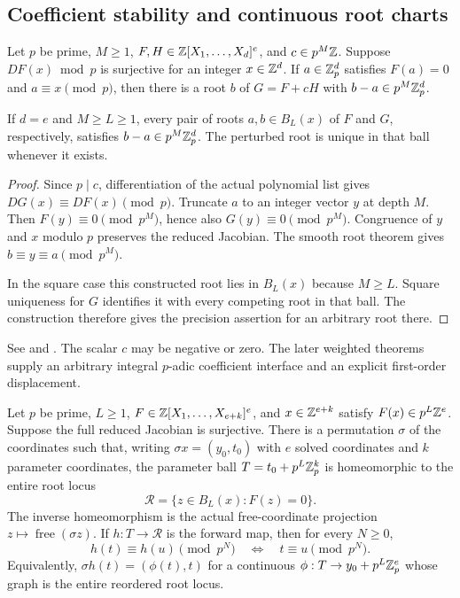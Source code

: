 \subsection{Coefficient stability and continuous root charts}

\begin{proposition}\label{prop:smooth-coefficient-stability}
Let $p$ be prime, $M\ge1$, $F,H\in\mathbb Z[X_1,\ldots,X_d]^e$, and
$c\in p^M\mathbb Z$. Suppose $DF(x)\bmod p$ is surjective for an integer
$x\in\mathbb Z^d$. If $a\in\mathbb Z_p^d$ satisfies $F(a)=0$ and
$a\equiv x\pmod p$, then there is a root $b$ of $G=F+cH$ with
$b-a\in p^M\mathbb Z_p^d$.

If $d=e$ and $M\ge L\ge1$, every pair of roots $a,b\in B_L(x)$ of
$F$ and $G$, respectively, satisfies $b-a\in p^M\mathbb Z_p^d$. The perturbed
root is unique in that ball whenever it exists.
\end{proposition}

\begin{proof}
Since $p\mid c$, differentiation of the actual polynomial list gives
$DG(x)\equiv DF(x)\pmod p$. Truncate $a$ to an integer vector $y$ at
depth $M$. Then $F(y)\equiv0\pmod{p^M}$, hence also
$G(y)\equiv0\pmod{p^M}$. Congruence of $y$ and $x$ modulo $p$ preserves
the reduced Jacobian. The smooth root theorem gives
$b\equiv y\equiv a\pmod{p^M}$.

In the square case this constructed root lies in $B_L(x)$ because $M\ge L$.
Square uniqueness for $G$ identifies it with every competing root in that
ball. The construction therefore gives the precision assertion for an
arbitrary root there.
\end{proof}

See 
and .
The scalar $c$ may be negative or zero. The later weighted theorems supply
an arbitrary integral $p$-adic coefficient interface and an explicit
first-order displacement.

\begin{theorem}
\label{thm:continuous-parameter-chart}
Let $p$ be prime, $L\ge1$,
$F\in\mathbb Z[X_1,\ldots,X_{e+k}]^e$, and $x\in\mathbb Z^{e+k}$ satisfy
$F(x)\in p^L\mathbb Z^e$. Suppose the full reduced Jacobian is surjective.
There is a permutation $\sigma$ of the coordinates such that, writing
$\sigma x=(y_0,t_0)$ with $e$ solved coordinates and $k$ parameter
coordinates, the parameter ball
$T=t_0+p^L\mathbb Z_p^k$ is homeomorphic to the entire root locus
\[
 \mathcal R=\{z\in B_L(x):F(z)=0\}.
\]
The inverse homeomorphism is the actual free-coordinate projection
$z\mapsto\operatorname{free}(\sigma z)$. If $h:T\to\mathcal R$ is the
forward map, then for every $N\ge0$,
\begin{equation}\label{eq:chart-congruence}
 h(t)\equiv h(u)\pmod{p^N}
 \quad\Longleftrightarrow\quad t\equiv u\pmod{p^N}.
\end{equation}
Equivalently, $\sigma h(t)=(\phi(t),t)$ for a continuous
$\phi:T\to y_0+p^L\mathbb Z_p^e$ whose graph is the entire reordered root locus.
\end{theorem}

